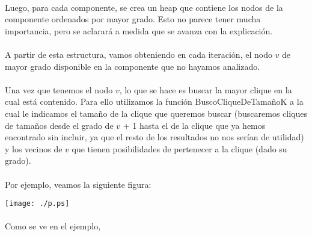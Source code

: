 \paragraph{}
Luego, para cada componente, se crea un heap que contiene los nodos de la componente ordenados por mayor grado. Esto no parece tener mucha importancia, pero se aclarará a medida que se avanza con la explicación.

\paragraph{}
A partir de esta estructura, vamos obteniendo en cada iteración, el nodo $v$ de mayor grado disponible en la componente que no hayamos analizado.

\paragraph{}
Una vez que tenemos el nodo $v$, lo que se hace es buscar la mayor clique en la cual está contenido. Para ello utilizamos la función BuscoCliqueDeTamañoK a la cual le indicamos el tamaño de la clique que queremos buscar (buscaremos cliques de tamaños desde el grado de $v$ + 1 hasta el de la clique que ya hemos encontrado sin incluir, ya que el resto de los resultados no nos serían de utilidad) y los vecinos de $v$ que tienen posibilidades de pertenecer a la clique (dado su grado).

\paragraph{}
Por ejemplo, veamos la siguiente figura:

\texttt{[image: ./p.ps]} \\

\paragraph{}
Como se ve en el ejemplo, 


